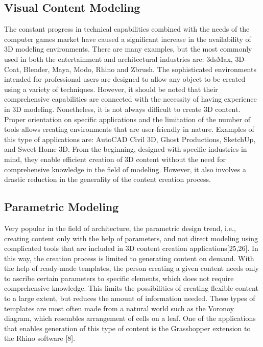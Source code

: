 \documentclass[runningheads]{llncs}
\begin{document}
\subsection{Visual Content Modeling}
The constant progress in technical capabilities combined with the needs of the computer games market have caused a significant increase in the availability of 3D modeling environments. There are many examples, but the most commonly used in both the entertainment and architectural industries are: 3dsMax, 3D-Coat, Blender, Maya, Modo, Rhino and Zbrush. The sophisticated environments intended for professional users are designed to allow any object to be created using a variety of techniques. However, it should be noted that their comprehensive capabilities are connected with the necessity of having experience in 3D modeling. Nonetheless, it is not always difficult to create 3D content. Proper orientation on specific applications and the limitation of the number of tools allows creating environments that are user-friendly in nature. Examples of this type of applications are: AutoCAD Civil 3D, Ghost Productions, SketchUp, and Sweet Home 3D. From the beginning, designed with specific industries in mind, they enable efficient creation of 3D content without the need for comprehensive knowledge in the field of modeling. However, it also involves a drastic reduction in the generality of the content creation process.

\subsection{Parametric Modeling}
Very popular in the field of architecture, the parametric design trend, i.e., creating content only with the help of parameters, and not direct modeling using complicated tools that are included in 3D content creation applications[25,26]. In this way, the creation process is limited to generating content on demand. With the help of ready-made templates, the person creating a given content needs only to ascribe certain parameters to specific elements, which does not require comprehensive knowledge. This limits the possibilities of creating flexible content to a large extent, but reduces the amount of information needed. These types of templates are most often made from a natural world such as the Voronoy diagram, which resembles arrangement of cells on a leaf. One of the applications that enables generation of this type of content is the Grasshopper extension to the Rhino software [8].
\end{document}
